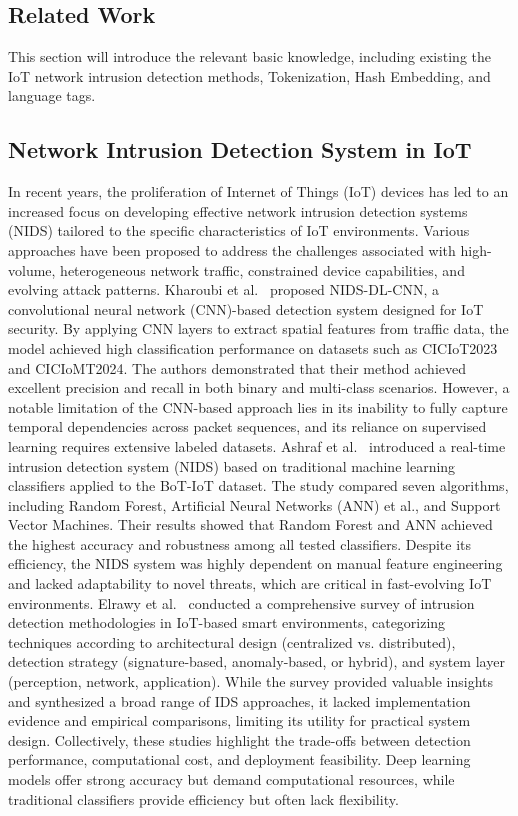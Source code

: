 \begin{ZhChapter}
    \chapter{Related Work}
    This section will introduce the relevant basic knowledge, including existing the IoT network intrusion detection methods, Tokenization, Hash Embedding, and language tags.

    \section{Network Intrusion Detection System in IoT}
    In recent years, the proliferation of Internet of Things (IoT) devices has led to an increased focus on developing effective network intrusion detection systems (NIDS) tailored to the specific characteristics of IoT environments. Various approaches have been proposed to address the challenges associated with high-volume, heterogeneous network traffic, constrained device capabilities, and evolving attack patterns. Kharoubi et al.~\cite{kharoubi2025nidscnn} proposed NIDS-DL-CNN, a convolutional neural network (CNN)-based detection system designed for IoT security. By applying CNN layers to extract spatial features from traffic data, the model achieved high classification performance on datasets such as CICIoT2023 and CICIoMT2024. The authors demonstrated that their method achieved excellent precision and recall in both binary and multi-class scenarios. However, a notable limitation of the CNN-based approach lies in its inability to fully capture temporal dependencies across packet sequences, and its reliance on supervised learning requires extensive labeled datasets. Ashraf et al.~\cite{ashraf2025inids} introduced a real-time intrusion detection system (NIDS) based on traditional machine learning classifiers applied to the BoT-IoT dataset. The study compared seven algorithms, including Random Forest, Artificial Neural Networks (ANN) et al., and Support Vector Machines. Their results showed that Random Forest and ANN achieved the highest accuracy and robustness among all tested classifiers. Despite its efficiency, the NIDS system was highly dependent on manual feature engineering and lacked adaptability to novel threats, which are critical in fast-evolving IoT environments. Elrawy et al.~\cite{elrawy2018survey} conducted a comprehensive survey of intrusion detection methodologies in IoT-based smart environments, categorizing techniques according to architectural design (centralized vs. distributed), detection strategy (signature-based, anomaly-based, or hybrid), and system layer (perception, network, application). While the survey provided valuable insights and synthesized a broad range of IDS approaches, it lacked implementation evidence and empirical comparisons, limiting its utility for practical system design. Collectively, these studies highlight the trade-offs between detection performance, computational cost, and deployment feasibility. Deep learning models offer strong accuracy but demand computational resources, while traditional classifiers provide efficiency but often lack flexibility.



\end{ZhChapter}
